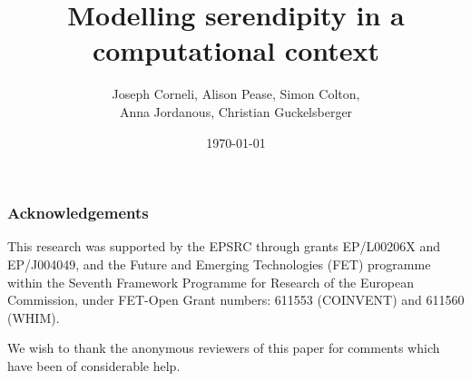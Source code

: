 \documentclass{llncs} %
\begin{document}
\title{Modelling serendipity in a computational context}
\author{Joseph Corneli, Alison Pease, Simon Colton,\\ Anna Jordanous, Christian Guckelsberger}
\date{\today}

\maketitle



\setcounter{footnote}{0}





% 
% 
% 
















\subsubsection*{Acknowledgements}
This research was supported by the EPSRC through grants EP/L00206X and
EP/J004049, and the Future and Emerging Technologies (FET) programme
within the Seventh Framework Programme for Research of the European
Commission, under FET-Open Grant numbers: 611553 (COINVENT) and 611560
(WHIM).

We wish to thank the anonymous reviewers of this paper for comments
which have been of considerable help.




% 
\end{document}
